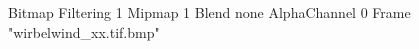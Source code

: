 {Bitmap
	{Filtering 1}
	{Mipmap 1}
	{Blend none}
	{AlphaChannel 0}
	{Frame "wirbelwind_xx.tif.bmp"}
}
